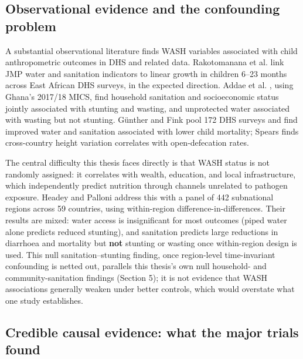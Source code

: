 \subsection{Observational evidence and the confounding problem}\label{sec:2.2}

A substantial observational literature finds WASH variables associated with child anthropometric outcomes in DHS and related data. Rakotomanana et al. \autocite*{Rakotomanana2020} link JMP water and sanitation indicators to linear growth in children 6--23 months across East African DHS surveys, in the expected direction. Addae et al. \autocite*{Addae2024}, using Ghana's 2017/18 MICS, find household sanitation and socioeconomic status jointly associated with stunting and wasting, and unprotected water associated with wasting but not stunting. Günther and Fink \autocite*{Gunther2010} pool 172 DHS surveys and find improved water and sanitation associated with lower child mortality; Spears \autocite*{Spears2013} finds cross-country height variation correlates with open-defecation rates.

The central difficulty this thesis faces directly is that WASH status is not randomly assigned: it correlates with wealth, education, and local infrastructure, which independently predict nutrition through channels unrelated to pathogen exposure. Headey and Palloni \autocite*{HeadeyPalloni2019} address this with a panel of 442 subnational regions across 59 countries, using within-region difference-in-differences. Their results are mixed: water access is insignificant for most outcomes (piped water alone predicts reduced stunting), and sanitation predicts large reductions in diarrhoea and mortality but \textbf{not} stunting or wasting once within-region design is used. This null sanitation--stunting finding, once region-level time-invariant confounding is netted out, parallels this thesis's own null household- and community-sanitation findings (Section 5); it is not evidence that WASH associations generally weaken under better controls, which would overstate what one study establishes.

\subsection{Credible causal evidence: what the major trials found}\label{sec:2.3}

